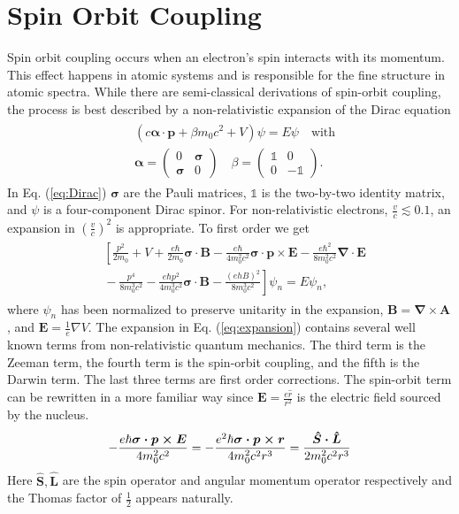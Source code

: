 \documentclass[12pt]{article}
\newcommand{\newln}{\\&{}}
\begin{document}
\section{Spin Orbit Coupling}
Spin orbit coupling occurs when an electron's spin interacts with its momentum.
This effect happens in atomic systems and is responsible for the fine structure in atomic spectra.
While there are semi-classical derivations of spin-orbit coupling, the process is best described by a non-relativistic expansion of the Dirac equation \cite{Dirac, Winkler}
\begin{align}\begin{split}
  \label{eq:Dirac}
  & (c\boldsymbol{\alpha\cdot p}+\beta m_{0}c^2+V)\psi=E\psi \quad\text{with}\newln\boldsymbol{\alpha}=\left(\begin{array}{cc} 0 & \boldsymbol{\sigma} \\ \boldsymbol{\sigma} & 0 \end{array} \right) \quad \beta=\left(\begin{array}{cc} \mathbb{1} & 0 \\ 0 & -\mathbb{1} \end{array} \right)\text{.}
\end{split}\end{align}
In Eq. (\ref{eq:Dirac}) $\boldsymbol\sigma$ are the Pauli matrices, $\mathbb{1}$ is the two-by-two identity matrix, and $\psi$ is a four-component Dirac spinor.
For non-relativistic electrons, $\frac{v}{c}\lesssim 0.1$, an expansion in $(\frac{v}{c})^2$ is appropriate.
To first order we get
\begin{align}\begin{split}
  \label{eq:expansion}
& \left [ \frac{p^2}{2m_0}\right.+V+\frac{e\hbar}{2m_0}\boldsymbol{\sigma\cdot B}-\frac{e\hbar}{4m_0^2c^2}\boldsymbol{\sigma\cdot p \times E}-\frac{e\hbar^2}{8m_0^2c^2}\boldsymbol{\nabla\cdot E} \newln-\frac{p^4}{8m_0^3c^2}-\frac{e\hbar p^2}{4m_0^3c^2}\boldsymbol{\sigma \cdot B}-\left.\frac{(ehB)^2}{8m_0^3c^2}\right]\psi_n=E\psi_n\text{,}
\end{split}\end{align}
where $\psi_n$ has been normalized to preserve unitarity in the expansion, $\boldsymbol{B}=\boldsymbol{\nabla}\times\boldsymbol{A}$, and $\boldsymbol{E}=\frac{1}{e}\nabla V$.
The expansion in Eq. (\ref{eq:expansion}) contains several well known terms from non-relativistic quantum mechanics.
The third term is the Zeeman term, the fourth term is the spin-orbit coupling, and the fifth is the Darwin term.
The last three terms are first order corrections.
The spin-orbit term can be rewritten in a more familiar way since $\boldsymbol{E}=\frac{e\hat{r}}{r^2}$ is the electric field sourced by the nucleus.
\begin{align}
  \label{eq:soc}
  -\frac{e\hbar\boldsymbol{\sigma\cdot p \times E}}{4m_0^2c^2}=-\frac{e^2\hbar\boldsymbol{\sigma\cdot p \times r}}{4m_0^2c^2r^3}\newline=\frac{\boldsymbol{\hat{S}\cdot \hat{L}}}{2m_0^2c^2r^3}
\end{align}
Here $\hat{\boldsymbol{S}}, \hat{\boldsymbol{L}}$ are the spin operator and angular momentum operator respectively and the Thomas factor of $\frac{1}{2}$ appears naturally.
\end{document}

